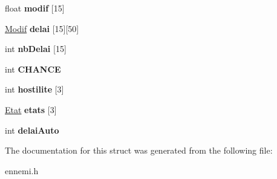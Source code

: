 \begin{DoxyCompactItemize}
\item 
\mbox{\label{structEnnemi_aa11719a862009c7d8a69a048034a8273}} 
float {\bfseries modif} \mbox{[}15\mbox{]}
\item 
\mbox{\label{structEnnemi_afd0c3f2e50667ce6427221b1e08c38b6}} 
\mbox{\hyperlink{structModif}{Modif}} {\bfseries delai} \mbox{[}15\mbox{]}\mbox{[}50\mbox{]}
\item 
\mbox{\label{structEnnemi_ab9cdf343d2da6fa03fdb72f02eeb9833}} 
int {\bfseries nb\+Delai} \mbox{[}15\mbox{]}
\item 
\mbox{\label{structEnnemi_a945df979353d07704c0cc10119072387}} 
int {\bfseries C\+H\+A\+N\+CE}
\item 
\mbox{\label{structEnnemi_a7714477f780e8c9c8a930aaf6f2e566a}} 
int {\bfseries hostilite} \mbox{[}3\mbox{]}
\item 
\mbox{\label{structEnnemi_ad5b3aaaa0f063dc7fdad2d81c8054543}} 
\mbox{\hyperlink{structEtat}{Etat}} {\bfseries etats} \mbox{[}3\mbox{]}
\item 
\mbox{\label{structEnnemi_a458c3d677cd685e0b6bbf0e84596a16e}} 
int {\bfseries delai\+Auto}
\end{DoxyCompactItemize}


The documentation for this struct was generated from the following file\+:\begin{DoxyCompactItemize}
\item 
ennemi.\+h\end{DoxyCompactItemize}
